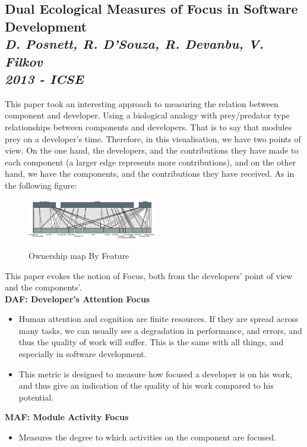 \subsection{Dual Ecological Measures of Focus in Software Development\\ \textit{D. Posnett, R. D’Souza, R. Devanbu, V. Filkov\\ 2013 - ICSE}}

This paper took an interesting approach to measuring the relation between component and developer. Using a biological analogy with prey/predator type relationships between components and developers. That is to say that modules prey on a developer's time. Therefore, in this visualisation, we have two points of view. On the one hand, the developers, and the contributions they have made to each component (a larger edge represents more contributions), and on the other hand, we have the components, and the contributions they have received. As in the following figure:

\begin{figure}[H]
\centering
\includegraphics[width=0.5\textwidth]{./resources/focus.png}~
\caption{Ownership map By Feature}
\label{fig:ownership_map_by_feature}
\end{figure}

This paper evokes the notion of Focus, both from the developers' point of view and the components'.
\\[0.4cm]
\textbf{DAF: Developer’s Attention Focus}
\begin{itemize}
\item Human attention and cognition are finite resources. If they are spread across many tasks, we can usually see a degradation in performance, and errors, and thus the quality of work will suffer. This is the same with all things, and especially in software development.
\item This metric is designed to measure how focused a developer is on his work, and thus give an indication of the quality of his work compared to his potential.
\end{itemize}

\textbf{MAF: Module Activity Focus}
\begin{itemize}
\item Measures the degree to which activities on the component are focused.
\end{itemize}

